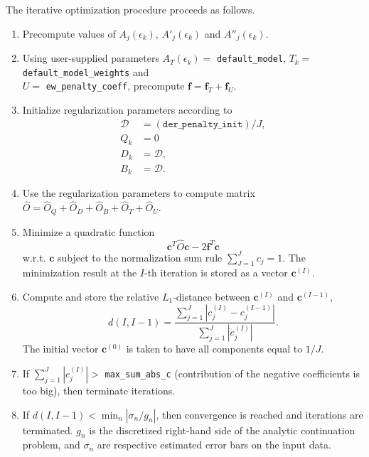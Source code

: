 \documentclass[]{article}
\begin{document}
The iterative optimization procedure proceeds as follows.
\begin{enumerate}
    \item Precompute values of $A_j(\epsilon_k)$, $A'_j(\epsilon_k)$ and $A''_j(\epsilon_k)$.

    \item Using user-supplied parameters $A_T(\epsilon_k) =$ \verb|default_model|, $T_k =$ \verb|default_model_weights| and\\ $U=$ \verb|ew_penalty_coeff|, precompute $\mathbf{f} = \mathbf{f}_T + \mathbf{f}_U$.

    \item Initialize regularization parameters according to
    \begin{align*}
        \mathcal{D} &= (\mathtt{der\_penalty\_init}) / J,\\
        Q_k &= 0 \\
        D_k &= \mathcal{D},\\
        B_k &= \mathcal{D}.
    \end{align*}

    \item Use the regularization parameters to compute matrix $\hat O = \hat O_Q + \hat O_D + \hat O_B + \hat O_T + \hat O_U$.
    
    \item Minimize a quadratic function
    \begin{equation}
        \mathbf{c}^T \hat O \mathbf{c} -2\mathbf{f}^T\mathbf{c}
    \end{equation}
    w.r.t. $\mathbf{c}$ subject to the normalization sum rule $\sum_{J=1}^J c_j = 1$. The minimization result at the $I$-th iteration is stored as a vector
    $\mathbf{c}^{(I)}$.

    \item Compute and store the relative $L_1$-distance between
    $\mathbf{c}^{(I)}$ and $\mathbf{c}^{(I-1)}$,
    \begin{equation}
        d(I, I-1) = \frac{\sum_{j=1}^J |c^{(I)}_j - c^{(I-1)}_j|}
                         {\sum_{j=1}^J |c^{(I)}_j|}.
    \end{equation}
    The initial vector $\mathbf{c}^{(0)}$ is taken to have all components equal to $1/J$.

    \item If $\sum_{j=1}^J |c^{(I)}_j| >$ \verb|max_sum_abs_c| (contribution of the negative coefficients is too big), then terminate iterations.

    \item If $d(I, I-1) < \min_n |\sigma_n/g_n|$, then convergence is reached and iterations are terminated. $g_n$ is the discretized right-hand side of the analytic continuation problem, and $\sigma_n$ are respective estimated error bars on the input data.


\end{enumerate}
\end{document}
